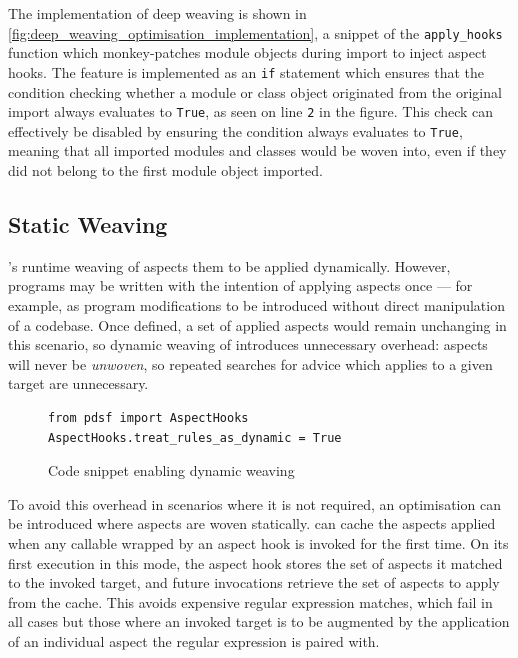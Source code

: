 The implementation of deep weaving is shown in
\cref{fig:deep_weaving_optimisation_implementation}, a snippet of the
\lstinline{apply_hooks} function which monkey-patches module objects during
import to inject aspect hooks. The feature is implemented as an \lstinline{if}
statement which ensures that the condition checking whether a module or class
object originated from the original import always evaluates to \lstinline{True}, as seen
on line \texttt{2} in the figure. This check can effectively be disabled by
ensuring the condition always evaluates to \lstinline{True}, meaning that all
imported modules and classes would be woven into, even if they did not belong to
the first module object imported.


\subsection{Static Weaving}
\label{static_weaving}

\pdsfthree{}'s runtime weaving of aspects them to be applied dynamically. However,
programs may be written with the intention of applying aspects once --- for
example, as program modifications to be introduced without direct manipulation
of a codebase. Once defined, a set of applied aspects would remain unchanging in
this scenario, so dynamic weaving of \pdsfthree introduces unnecessary overhead:
aspects will never be \emph{unwoven}, so repeated searches for advice which
applies to a given target are unnecessary. 

\begin{figure}[h]
    \begin{lstlisting}[style=footnotesize_python]
from pdsf import AspectHooks
AspectHooks.treat_rules_as_dynamic = True
    \end{lstlisting}
    \caption{Code snippet enabling dynamic weaving}
    \label{fig:enabling_dynamic_weaving}
\end{figure}

To avoid this overhead in scenarios where it is not required, an optimisation
can be introduced where aspects are woven statically. \pdsfthree can cache the
aspects applied when any callable wrapped by an aspect hook is invoked for the
first time. On its first execution in this mode, the aspect hook stores the set
of aspects it matched to the invoked target, and future invocations retrieve the
set of aspects to apply from the cache. This avoids expensive regular expression
matches,
which fail in all cases but those where an invoked target is to be augmented by
the application of an individual aspect the regular expression is paired
with.

